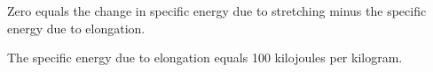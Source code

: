 Zero equals the change in specific energy due to stretching minus the specific energy due to elongation.

The specific energy due to elongation equals 100 kilojoules per kilogram.